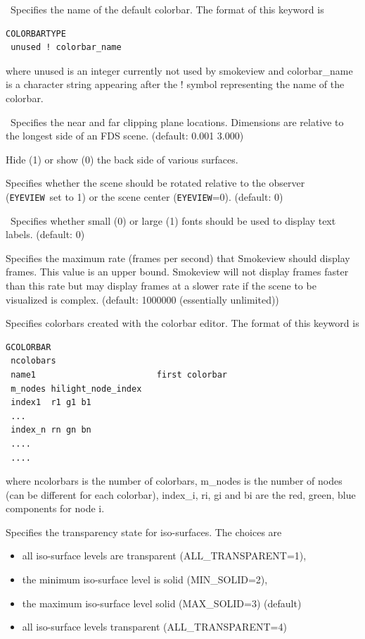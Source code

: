 \documentclass[11pt,twoside]{book}
\begin{document}

\ Specifies the name of the default colorbar.
The format of this keyword is
\begin{lstlisting}
COLORBARTYPE
 unused ! colorbar_name
\end{lstlisting}
where unused is an integer currently not used by smokeview and colorbar\_name is
a character string appearing after the ! symbol representing the name of the colorbar.

\ Specifies the near and far clipping plane
locations.  Dimensions are relative to the longest side of
an FDS scene. (default: 0.001 3.000)


Hide (1) or show (0) the back side of various surfaces.

Specifies whether
the scene should be rotated relative to the observer ({\tt EYEVIEW}\ set to 1)
or the scene center ({\tt EYEVIEW}=0).
(default: 0)

\ Specifies whether small (0) or large (1)
fonts should be used to display text labels. (default: 0)

Specifies the maximum rate (frames per
second) that Smokeview should display frames. This value is an
upper bound.  Smokeview will not display frames faster than this
rate but may display frames at a slower rate if the scene to be
visualized is complex. (default: 1000000 (essentially unlimited))

Specifies colorbars created with the colorbar editor.
The format of this keyword is
\begin{lstlisting}
GCOLORBAR
 ncolobars
 name1                        first colorbar
 m_nodes hilight_node_index
 index1  r1 g1 b1
 ...
 index_n rn gn bn
 ....
 ....

\end{lstlisting}
where ncolorbars is the number of colorbars, m\_nodes is the number of nodes
(can be different for each colorbar), index\_i, ri, gi and bi are the red, green, blue components for
node i.


Specifies the transparency state for iso-surfaces. The choices
are
\begin{itemize}
\item all iso-surface levels are transparent (ALL\_TRANSPARENT=1),
\item the minimum iso-surface level is solid (MIN\_SOLID=2),
\item the maximum iso-surface level solid (MAX\_SOLID=3) (default)
\item all iso-surface levels transparent (ALL\_TRANSPARENT=4)
\end{itemize}
\end{document}

